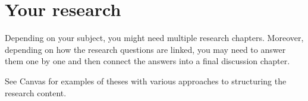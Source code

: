 \documentclass[../main]{subfiles}
\begin{document}
\chapter{Your research}
\label{ch:research}

Depending on your subject, you might need multiple research chapters. Moreover, depending on how the research questions are linked, you may need to answer them one by one and then connect the answers into a final discussion chapter. 

See Canvas for examples of theses with various approaches to structuring the research content.
\end{document}
